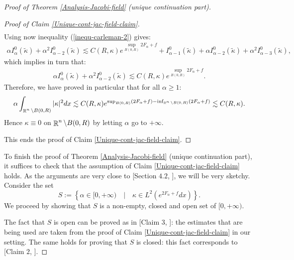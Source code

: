 \documentclass[a4paper,11pt,reqno]{amsart}
\def\R{\mathop{\rm \mathbb{R}}\nolimits}
\begin{document}
\begin{proof}[Proof of Theorem \ref{Analysis-Jacobi-field} (unique continuation part)]
\begin{proof}[Proof of Claim \ref{Unique-cont-jac-field-claim}]
\begin{eqnarray*}
\end{eqnarray*}
Using now inequality (\ref{inequ-carleman-2}) gives:
\begin{eqnarray*}
\alpha I^{0}_{\alpha}(\tilde{\kappa})+\alpha^2I^0_{\alpha-2}(\tilde{\kappa})\lesssim C(R,\kappa)e^{\sup_{B(0,R)}2F_{\alpha}+f}+I^0_{\alpha-1}(\tilde{\kappa})+\alpha I^0_{\alpha-2}(\tilde{\kappa})+\alpha^2 I^0_{\alpha-3}(\tilde{\kappa}),
\end{eqnarray*}
which implies in turn that:
\begin{eqnarray*}
\alpha I^{0}_{\alpha}(\tilde{\kappa})+\alpha^2I^0_{\alpha-2}(\tilde{\kappa})\lesssim C(R,\kappa)e^{\sup_{B(0,R)}2F_{\alpha}+f}.
\end{eqnarray*}
Therefore, we have proved in particular that for all $\alpha\geq 1$:
\begin{eqnarray*}
\alpha\int_{\R^n\setminus B(0,R)}|\kappa|^2dx\lesssim C(R,\kappa)e^{\sup_{B(0,R)}(2F_{\alpha}+f)-\inf_{\R^n\setminus B(0,R)}(2F_{\alpha}+f)}\lesssim  C(R,\kappa).
\end{eqnarray*}
Hence $\kappa\equiv 0$ on $\R^n\setminus B(0,R)$ by letting $\alpha$ go to $+\infty$.

This ends the proof of Claim \ref{Unique-cont-jac-field-claim}.

 
\end{proof}
To finish the proof of Theorem \ref{Analysis-Jacobi-field} (unique continuation part), it suffices to check that the assumption of Claim \ref{Unique-cont-jac-field-claim} holds. As the arguments are very close to [Section $4.2$, \cite{Uni-Con-Egs-Der}], we will be very sketchy. Consider the set $$S:=\left\{\alpha\in [0,+\infty)\quad|\quad \kappa\in L^2\left(e^{2F_{\alpha}+f}dx\right)\right\}.$$ We proceed by showing that $S$ is a non-empty, closed and open set of $[0,+\infty)$. 

The fact that $S$ is open can be proved as in [Claim $3$, \cite{Uni-Con-Egs-Der}]: the estimates that are being used are taken from the proof of Claim \ref{Unique-cont-jac-field-claim} in our setting. The same holds for proving that $S$ is closed: this fact corresponds to [Claim $2$, \cite{Uni-Con-Egs-Der}]. 


\end{proof}
\end{document}
